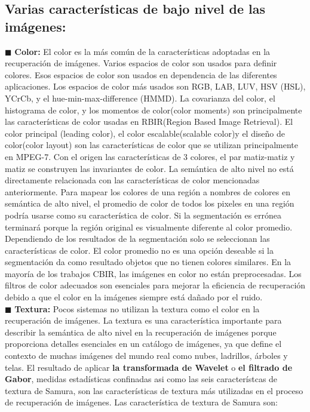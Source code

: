 \documentclass{llncs}
\begin{document}
\subsection { Varias caracter\'isticas de bajo nivel de las im\'agenes:}


$\blacksquare$  \textbf{Color:} El color es la m\'as com\'un de la caracter\'isticas adoptadas en la recuperaci\'on de im\'agenes. Varios espacios de color son usados 
para definir colores. Esos espacios de color son usados en dependencia de las diferentes aplicaciones. Los espacios de color 
m\'as usados son  RGB, LAB, LUV, HSV (HSL), YCrCb, y el hue-min-max-difference (HMMD). La covarianza del color, el histograma 
de color, y los momentos de color(color moments) son principalmente las caracter\'isticas de color usadas en RBIR(Region Based Image Retrieval).
 El color principal (leading color), el color escalable(scalable color)y el dise\~{n}o de color(color layout) son las caracter\'isticas 
de color que se utilizan principalmente en MPEG-7. Con el origen las caracter\'isticas de 3 colores, el par matiz-matiz y matiz
se construyen las invariantes de color. La sem\'antica de alto nivel no est\'a directamente relacionada con las caracter\'isticas 
de color mencionadas anteriormente. Para mapear los colores de una regi\'on a nombres de colores en sem\'antica de alto nivel,
el promedio de color de todos los pixeles  en una regi\'on podr\'ia usarse como su caracter\'istica de color. Si la segmentaci\'on
es err\'onea terminar\'a porque la regi\'on original es visualmente diferente al color promedio. Dependiendo de los resultados 
de la segmentaci\'on solo se seleccionan las caracter\'isticas de color. El color promedio no es una opci\'on deseable si la
segmentaci\'on da como resultado objetos que no tienen colores similares. En la mayor\'ia de los trabajos CBIR, las im\'agenes en color no
est\'an preprocesadas. Los filtros de color adecuados son esenciales para mejorar la eficiencia de recuperaci\'on debido a que el color 
en la im\'agenes siempre est\'a da\~{n}ado por el ruido.\\
$\blacksquare$  \textbf{Textura:}
Pocos sistemas no utilizan la textura como el color en la recuperaci\'on de im\'agenes. La textura es una caracter\'istica importante 
para describir la sem\'antica de alto nivel en la recuperaci\'on de im\'agenes porque proporciona detalles esenciales en un cat\'alogo 
de im\'agenes, ya que define el contexto de muchas im\'agenes del mundo real como nubes, ladrillos, \'arboles y telas. El resultado
de aplicar \textbf{la transformada de Wavelet}    o \textbf{el filtrado de Gabor}, medidas estad\'isticas confinadas asi como las
seis caracter\'istcas de textura de Samura, son las caracter\'isticas de textura m\'as utilizadas en el proceso de recuperaci\'on de 
im\'agenes.  Las caracter\'istica de textura de Samura son:\\
\end{document}
